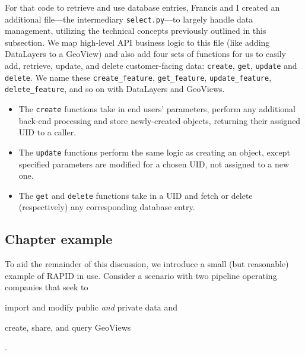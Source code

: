 For that code to retrieve and use database entries, Francis and I created an additional file---the intermediary \texttt{select.py}---to largely handle data management, utilizing the technical concepts previously outlined in this subsection. We map high-level API business logic to this file (like adding DataLayers to a GeoView) and also add four sets of functions for us to easily add, retrieve, update, and delete customer-facing data: \texttt{create}, \texttt{get}, \texttt{update} and \texttt{delete}. We name these \texttt{create\_feature}, \texttt{get\_feature}, \texttt{update\_feature}, \texttt{delete\_feature}, and so on with DataLayers and GeoViews.

\begin{itemize}
\item The \texttt{create} functions take in end users' parameters, perform any additional back-end processing and store newly-created objects, returning their assigned UID to a caller.
\item The \texttt{update} functions perform the same logic as creating an object, except specified parameters are modified for a chosen UID, not assigned to a new one.
\item The \texttt{get} and \texttt{delete} functions take in a UID and fetch or delete (respectively) any corresponding database entry.
\end{itemize}

  


\subsection{Chapter example}
To aid the remainder of this discussion, we introduce a small (but reasonable) example of RAPID in use. Consider a scenario with two pipeline operating companies that seek to
\begin{enumerate*}[label=\itshape\alph*\upshape)]
\item import and modify public \textit{and} private data and
\item create, share, and query GeoViews
\end{enumerate*}.

